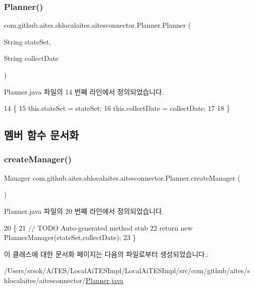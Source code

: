 \subsubsection{\texorpdfstring{Planner()}{Planner()}}
{\footnotesize\ttfamily com.\+github.\+aites.\+shlocalaites.\+aitesconnector.\+Planner.\+Planner (\begin{DoxyParamCaption}\item[{String}]{state\+Set,  }\item[{String}]{collect\+Date }\end{DoxyParamCaption})}



Planner.\+java 파일의 14 번째 라인에서 정의되었습니다.


\begin{DoxyCode}
14                                                        \{
15         this.stateSet = stateSet;
16         this.collectDate = collectDate;
17     
18     \}
\end{DoxyCode}


\subsection{멤버 함수 문서화}
\mbox{\label{classcom_1_1github_1_1aites_1_1shlocalaites_1_1aitesconnector_1_1_planner_ad06f14c8d32f7b94c59f7aa43c213a23}} 
\subsubsection{\texorpdfstring{create\+Manager()}{createManager()}}
{\footnotesize\ttfamily Manager com.\+github.\+aites.\+shlocalaites.\+aitesconnector.\+Planner.\+create\+Manager (\begin{DoxyParamCaption}{ }\end{DoxyParamCaption})}



Planner.\+java 파일의 20 번째 라인에서 정의되었습니다.


\begin{DoxyCode}
20                                    \{
21         \textcolor{comment}{// TODO Auto-generated method stub}
22         \textcolor{keywordflow}{return} \textcolor{keyword}{new} PlannerManager(stateSet,collectDate);
23     \}
\end{DoxyCode}


이 클래스에 대한 문서화 페이지는 다음의 파일로부터 생성되었습니다.\+:\begin{DoxyCompactItemize}
\item 
/\+Users/srsok/\+Ai\+T\+E\+S/\+Local\+Ai\+T\+E\+S\+Impl/\+Local\+Ai\+T\+E\+S\+Impl/src/com/github/aites/shlocalaites/aitesconnector/\mbox{\hyperlink{_planner_8java}{Planner.\+java}}\end{DoxyCompactItemize}
